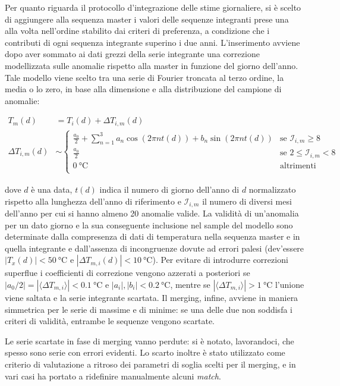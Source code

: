 Per quanto riguarda il protocollo d'integrazione delle stime giornaliere, si è scelto di aggiungere alla sequenza master i valori delle sequenze integranti prese una alla volta nell'ordine stabilito dai criteri di preferenza, a condizione che i contributi di ogni sequenza integrante superino i due anni.
L'inserimento avviene dopo aver sommato ai dati grezzi della serie integrante una correzione modellizzata sulle anomalie rispetto alla master in funzione del giorno dell'anno. Tale modello viene scelto tra una serie di Fourier troncata al terzo ordine, la media o lo zero, in base alla dimensione e alla distribuzione del campione di anomalie:

\begin{align*}
  T_m(d) &= T_i(d) + \Delta T_{i,m}(d) \\
  \Delta T_{i,m}(d) &\sim
  \begin{cases}
    \frac{a_0}{2} + \sum^3_{n=1} a_n \cos( 2\pi n t(d)) + b_n\sin(2\pi n t(d)) & \text{se } \mathcal{I}_{i,m} \ge 8 \\
    \frac{a_0}{2} & \text{se } 2 \le \mathcal{I}_{i,m} < 8 \\
    \qty{0}{\degreeCelsius} & \text{altrimenti} \\
  \end{cases}
\end{align*}

dove \(d\) è una data, \(t(d)\) indica il numero di giorno dell'anno di \(d\) normalizzato rispetto alla lunghezza dell'anno di riferimento e \(\mathcal{I}_{i,m}\) il numero di diversi mesi dell'anno per cui si hanno almeno 20 anomalie valide. La validità di un'anomalia per un dato giorno e la sua conseguente inclusione nel sample del modello sono determinate dalla compresenza di dati di temperatura nella sequenza master e in quella integrante e dall'assenza di incongruenze dovute ad errori palesi (dev'essere \(|T_x(d)| < \qty{50}{\degreeCelsius}\) e \(|\Delta T_{m,i}(d)| < \qty{10}{\degreeCelsius}\)). Per evitare di introdurre correzioni superflue i coefficienti di correzione vengono azzerati a posteriori se \(|a_0/2| = |\langle \Delta T_{m,i} \rangle| < \qty{0.1}{\degreeCelsius}\) e \(|a_i|, |b_i| < \qty{0.2}{\degreeCelsius}\), mentre se \(|\langle \Delta T_{m,i} \rangle| > \qty{1}{\degreeCelsius}\) l'unione viene saltata e la serie integrante scartata. Il merging, infine, avviene in maniera simmetrica per le serie di massime e di minime: se una delle due non soddisfa i criteri di validità, entrambe le sequenze vengono scartate.

Le serie scartate in fase di merging vanno perdute: si è notato, lavorandoci, che spesso sono serie con errori evidenti. Lo scarto inoltre è stato utilizzato come criterio di valutazione a ritroso dei parametri di soglia scelti per il merging, e in vari casi ha portato a ridefinire manualmente alcuni \emph{match}.

